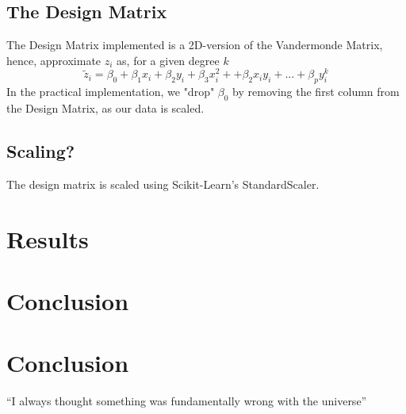 \documentclass[11pt,a4paper]{article}
\begin{document}
\subsection{The Design Matrix}
The Design Matrix implemented is a 2D-version of the Vandermonde Matrix, hence, approximate $z_i$ as, for a given degree $k$
\begin{equation*}
\tilde z_i=\beta_0+\beta_1x_i+\beta_2y_i+\beta_3x_i^2++\beta_2x_iy_i+...+\beta_py_i^k
\end{equation*}
In the practical implementation, we "drop" $\beta_0$ by removing the first column from the Design Matrix, as our data is scaled.
\subsection{Scaling?}
The design matrix is scaled using Scikit-Learn's StandardScaler.
\section{Results}
\section{Conclusion}

\section{Conclusion}
``I always thought something was fundamentally wrong with the universe'' \citep{hastie01statisticallearning}



\end{document}
